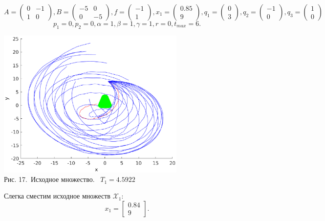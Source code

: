 \documentclass[11pt]{article}
\begin{document}
\[A = \begin{pmatrix}
0&-1\\
1&0
\end{pmatrix},
B = \begin{pmatrix}
-5&0\\
0&-5
\end{pmatrix},
f = \begin{pmatrix}
-1\\
1
\end{pmatrix} ,
x_1 = \begin{pmatrix}
0.85\\
9
\end{pmatrix},
q_1 = \begin{pmatrix}
0\\
3
\end{pmatrix},
q_2 = \begin{pmatrix}
-1\\
0
\end{pmatrix},
q_3 = \begin{pmatrix}
1\\
0
\end{pmatrix} \]
\[p_1 = 0, p_2 = 0, \alpha = 1,\beta = 1,\gamma = 1, r = 0, t_{max} = 6. \]

\begin{center}
	\includegraphics[width=0.7\textwidth]{pic_t_2.eps}\\
	{Рис. 17.\ Исходное множество. \ $T_1 = 4.5922$}
\end{center}
{Слегка сместим исходное множеств $\mathcal{X}_1$:}
\[ x_1 = \begin{bmatrix}
0.84\\
9
\end{bmatrix}. \]
\end{document}
